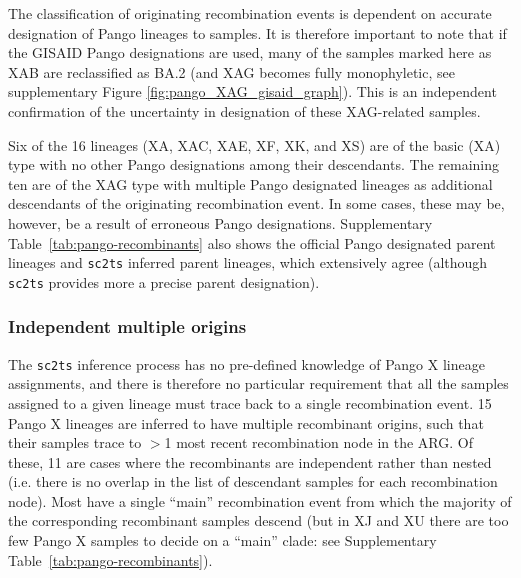 \documentclass{article}
\begin{document}
The classification of originating recombination events is dependent on
accurate designation of Pango lineages to samples. It is therefore important
to note that if the GISAID Pango designations are used, many of the samples
marked here as XAB are reclassified as BA.2 (and XAG becomes fully monophyletic,
see supplementary Figure \ref{fig:pango_XAG_gisaid_graph}). This is an
independent confirmation of the uncertainty in designation of these XAG-related
samples.

Six of the 16 lineages (XA, XAC, XAE, XF, XK, and XS) are of the
basic (XA) type with no other Pango designations among their descendants.
The remaining ten are of the XAG type with multiple Pango
designated lineages as additional descendants of the originating recombination event.
In some cases,
these may be, however, be a result of erroneous Pango designations.
Supplementary Table~\ref{tab:pango-recombinants} also shows the official
Pango designated parent lineages and \texttt{sc2ts} inferred parent lineages,
which extensively agree (although \texttt{sc2ts} provides more a precise
parent designation).

\subsubsection{Independent multiple origins}
The \texttt{sc2ts} inference process has no pre-defined knowledge
of Pango X lineage assignments, and there is therefore no particular
requirement that all the samples assigned to a given lineage must trace back to
a single recombination event. 15 Pango X lineages are inferred to have multiple
recombinant origins, such that their samples trace to $>$1 most recent
recombination node in the ARG. Of these, 11 are cases where the
recombinants are independent rather than nested (i.e. there is no overlap in the list
of descendant samples for each recombination node). Most have a single ``main''
recombination event from which the majority of the corresponding recombinant samples
descend (but in XJ and XU there are too few Pango X samples to decide on a ``main'' clade:
see Supplementary Table~\ref{tab:pango-recombinants}).
\end{document}
